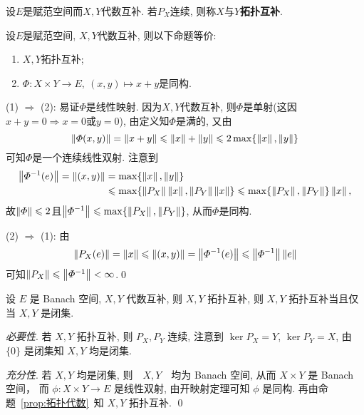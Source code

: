 	\begin{Definition}[拓扑互补]
	设$ E $是赋范空间而$ X, Y $代数互补. 若$ P_X $连续, 则称$ X $与$ Y $\textbf{拓扑互补}.
	\end{Definition}
	
	\begin{Proposition}\label{prop:拓扑代数}
	设$ E $是赋范空间, $ X, Y $代数互补, 则以下命题等价:
	\begin{enumerate}[(1)]
	\item $ X, Y $拓扑互补;
	\item $ \varPhi : X\times Y\to E,\ (x,y)\mapsto x+y $是同构.
	\end{enumerate}
	\end{Proposition}
	\begin{Proof}
	(1) $ \Rightarrow $ (2): 易证$ \varPhi $是线性映射. 因为$ X, Y $代数互补, 则$ \varPhi $是单射(这因$ x+y=0\Longrightarrow x=0 $或$ y=0 $), 由定义知$ \varPhi $是满的, 又由
	\[
	\left\| \varPhi(x,y) \right\|=\left\| x+y \right\|\leqslant\left\| x \right\|+\left\| y \right\|\leqslant 2\max\{ \left\| x \right\|,\left\| y \right\| \}
	\]
	可知$ \varPhi $是一个连续线性双射. 注意到
	\[
	\begin{aligned}
	\left\| \varPhi^{-1}(e) \right\|=\left\| (x,y) \right\|&=\max\{ \left\| x \right\|,\left\| y \right\| \}\\
	&\leqslant\max\{ \left\| P_X \right\|\left\| x \right\|, \left\| P_Y \right\|\left\| x \right\| \}\leqslant\max\{ \left\| P_X \right\|,\left\| P_Y \right\| \}\left\| x \right\|,
	\end{aligned}
	\]
	故$ \left\| \varPhi \right\|\leqslant 2 $且$ \left\| \varPhi^{-1} \right\|\leqslant\max\{ \left\| P_X \right\|,\left\| P_Y \right\| \} $, 从而$ \varPhi $是同构.
	
	(2) $ \Rightarrow $ (1): 由
	\[
	\left\| P_X(e) \right\|=\left\| x \right\|\leqslant\left\| (x,y) \right\|=\left\| \varPhi^{-1}(e) \right\|\leqslant\left\| \varPhi^{-1} \right\|\left\| e \right\|
	\]
	可知$ \left\| P_X \right\|\leqslant\left\| \varPhi^{-1} \right\|<\infty $.\qed
	\end{Proof}
	\begin{Corollary}
		设 $ E $ 是 Banach 空间,  $ X, Y $ 代数互补, 则 $ X, Y $ 拓扑互补, 则 $ X, Y $ 拓扑互补当且仅当 $ X, Y $ 是闭集. 
	\end{Corollary}
	\begin{Proof}
		\textsl{必要性}. 若 $ X, Y $ 拓扑互补, 则 $ P_{X}, P_{Y} $ 连续, 注意到 $ \ker P_{X} = Y $,  $ \ker P_{Y}=X $, 由 $ \{0\} $ 是闭集知 $ X, Y $ 均是闭集. 

		\textsl{充分性}.  若 $ X, Y $ 均是闭集, 则　$ X, Y $　均为 Banach 空间, 从而 $ X\times Y $ 是 Banach 空间， 而 $ \phi : X\times Y\to E $ 是线性双射, 由开映射定理可知 $ \phi $ 是同构. 再由命题~\ref{prop:拓扑代数}~知 $ X, Y $ 拓扑互补. \qed
	\end{Proof}

